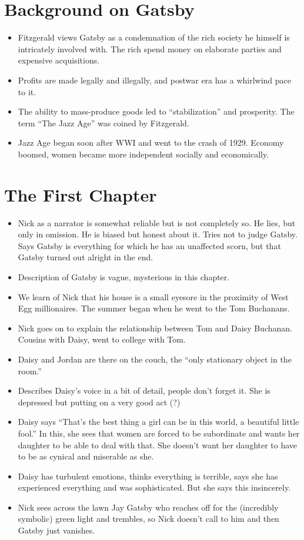 \documentclass[12pt]{article}
\begin{document}
\section*{Background on Gatsby}
\begin{itemize}
\item Fitzgerald views Gatsby as a condemnation of the rich society he 
  himself is intricately involved with.  The rich spend money on 
  elaborate parties and expensive acquisitions.
\item Profits are made legally and illegally, and postwar era has a 
  whirlwind pace to it.
\item The ability to mass-produce goods led to ``stabilization'' and 
  prosperity.  The term ``The Jazz Age'' was coined by Fitzgerald.
\item Jazz Age began soon after WWI and went to the crash of 1929.  
  Economy boomed, women became more independent socially and
  economically.
\end{itemize}

\section{The First Chapter}
\begin{itemize}
\item Nick as a narrator is somewhat reliable but is not completely 
  so.  He lies, but only in omission.  He is biased but honest
  about it.  Tries not to judge Gatsby.  Says Gatsby is 
  everything for which he has an unaffected scorn, but that 
  Gatsby turned out alright in the end.
              
\item Description of Gatsby is vague, mysterious in this chapter.
\item We learn of Nick that his house is a small eyesore in the 
  proximity of West Egg millionaires.  The summer began when he 
  went to the Tom Buchanans.  
\item Nick goes on to explain the relationship between Tom and Daisy 
  Buchanan.  Cousins with Daisy, went to college with Tom.  
\item Daisy and Jordan are there on the couch, the ``only stationary 
  object in the room.''
\item Describes Daisy's voice in a bit of detail, people don't forget 
  it.  She is depressed but putting on a very good act (?)
\item Daisy says ``That's the best thing a girl can be in this world, 
  a beautiful little fool.''  In this, she sees that women are 
  forced to be subordinate and wants her daughter to be able to 
  deal with that.  She doesn't want her daughter to have to be 
  as cynical and miserable as she.
\item Daisy has turbulent emotions, thinks everything is terrible, 
  says she has experienced everything and was sophisticated.  
  But she says this insincerely.  
\item Nick sees across the lawn Jay Gatsby who reaches off for the 
  (incredibly symbolic) green light and trembles, so Nick 
  doesn't call to him and then Gatsby just vanishes.
\end{itemize}
\end{document}
